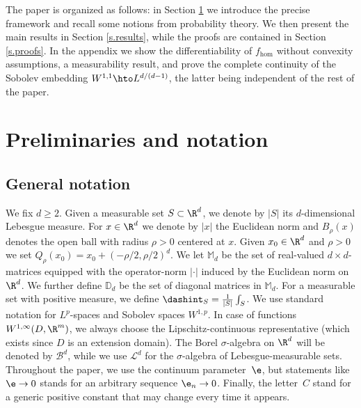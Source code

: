 The paper is organized as follows: in Section \ref{s.preliminaries} we introduce the precise framework and recall some notions from probability theory. We then present the main results in Section \ref{s.results}, while the proofs are contained in Section \ref{s.proofs}. In the appendix we show the differentiability of $f_{\hom}$ without convexity assumptions, a measurability result, and prove the complete continuity of the Sobolev embedding $W^{1,1}\hto L^{d/(d-1)}$, the latter being independent of the rest of the paper.

\section{Preliminaries and notation}\label{s.preliminaries}
\subsection{General notation}
We fix $d\geq 2$. Given a measurable set $S\subset\R^d$, we denote by $|S|$ its $d$-dimensional Lebesgue measure. For $x\in\R^d$ we denote by $|x|$ the Euclidean norm and $B_{\rho}(x)$ denotes the open ball with radius $\rho>0$ centered at $x$.
Given $x_0\in\R^d$ and $\rho>0$ we set $Q_{\rho}(x_0)=x_0+(-\rho/2,\rho/2)^d$. We let $\mathbb{M}_d$ be the set of real-valued $d\times d$-matrices equipped with the operator-norm $|\cdot|$ induced by the Euclidean norm on~$\R^d$. We further define $\mathbb{D}_d$ be the set of diagonal matrices in $\mathbb{M}_d$. For a measurable set with positive measure, we define $\dashint_S=\frac{1}{|S|}\int_S$. We use standard notation for $L^p$\nobreakdash-spaces and Sobolev spaces $W^{1,p}$. In case of functions $W^{1,\infty}(D,\R^m)$, we always choose the Lipschitz-continuous representative (which exists since $D$ is an extension domain). The Borel $\sigma$-algebra on $\R^d$ will be denoted by $\mathcal{B}^d$, while we use $\mathcal{L}^d$ for the $\sigma$-algebra of Lebesgue-measurable sets.
Throughout the paper, we use the continuum parameter~$\e$, but statements like $\e\to 0$ stands for an arbitrary sequence $\e_n\to 0$. Finally, the letter~$C$ stand for a generic positive constant that may change every time it appears.

